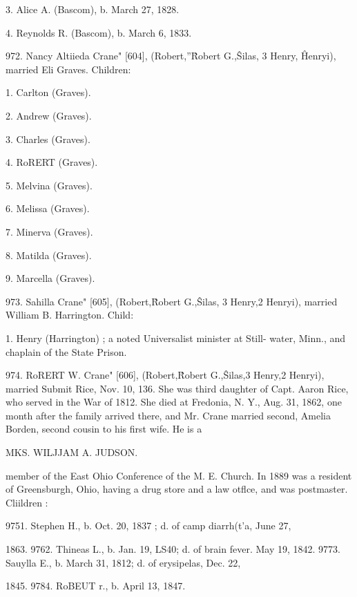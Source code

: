 \documentclass{book}
\begin{document}
3. Alice A. (Bascom), b. March 27, 1828. 

4. Reynolds R. (Bascom), b. March 6, 1833. 

972. Nancy Altiieda Crane" [604], (Robert,''\^ Robert G.,\^ 
Silas, 3 Henry, \^ Henryi), married Eli Graves. Children: 

1. Carlton (Graves). 

2. Andrew (Graves). 

3. Charles (Graves). 

4. RoRERT (Graves). 

5. Melvina (Graves). 

6. Melissa (Graves). 

7. Minerva (Graves). 

8. Matilda (Graves). 

9. Marcella (Graves). 

973. Sahilla Crane" [605], (Robert,\^ Robert G.,\^ Silas, 3 
Henry,2 Henryi), married William B. Harrington. Child: 

1. Henry (Harrington) ; a noted Universalist minister at Still- 
water, Minn., and chaplain of the State Prison. 

974. RoRERT W. Crane" [606], (Robert,\^ Robert G.,\^ Silas,3 
Henry,2 Henryi), married Submit Rice, Nov. 10, 136. She 
was third daughter of Capt. Aaron Rice, who served in the War 
of 1812. She died at Fredonia, N. Y., Aug. 31, 1862, one 
month after the family arrived there, and Mr. Crane married 
second, Amelia Borden, second cousin to his first wife. He is a 




MKS. WILJJAM A. JUDSON. 




member of the East Ohio Conference of the M. E. Church. In 
1889 was a resident of Greensburgh, Ohio, having a drug store 
and a law otflce, and was postmaster. Cliildren : 

9751. Stephen H., b. Oct. 20, 1837 ; d. of camp diarrh(t'a, June 27, 

1863. 
9762. Thineas L., b. Jan. 19, LS40; d. of brain fever. May 19, 1842. 
9773. Sauylla E., b. March 31, 1812; d. of erysipelas, Dec. 22, 

1845. 
9784. RoBEUT r., b. April 13, 1847. 
\end{document}
